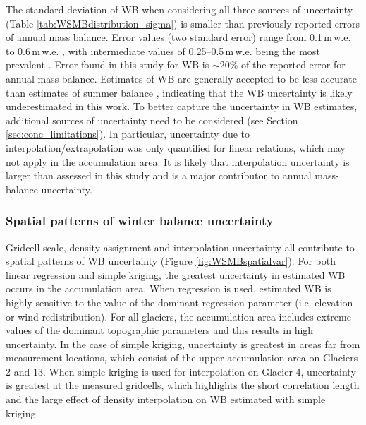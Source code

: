 \documentclass{sfuthesis}
\begin{document}
The standard deviation of WB when considering all three sources of uncertainty 
(Table \ref{tab:WSMBdistribution_sigma}) is smaller than previously reported errors of annual mass balance. Error values (two standard error) range from 0.1\,m\,w.e. \citep{Jansson1999} to 0.6\,m\,w.e. \citep{Funk1997}, with intermediate values of 0.25--0.5\,m\,w.e. being the most prevalent \citep[e.g.][]{Zemp2009,Wagnon2013}. Error found in this study for WB is $\sim$20\% of the reported error for annual mass balance. Estimates of WB are generally accepted to be less accurate than estimates of summer balance \citep[e.g.][]{Zemp2009,Reveillet2016}, indicating that the WB uncertainty is likely underestimated in this work. To better capture the uncertainty in WB estimates, additional sources of uncertainty need to be considered (see Section \ref{sec:conc_limitations}). In particular, uncertainty due to interpolation/extrapolation was only quantified for linear relations, which may not apply in the accumulation area. It is likely that interpolation uncertainty is larger than assessed in this study and is a major contributor to annual mass-balance uncertainty.


\subsubsection{Spatial patterns of winter balance uncertainty}

Gridcell-scale, density-assignment and interpolation uncertainty all contribute to spatial patterns of WB uncertainty (Figure \ref{fig:WSMBspatialvar}). For both linear regression and simple kriging, the greatest uncertainty in estimated WB occurs in the accumulation area. When regression is used, estimated WB is highly sensitive to the value of the dominant regression parameter (i.e. elevation or wind redistribution). For all glaciers, the accumulation area includes extreme values of the dominant topographic parameters and this results in high uncertainty. In the case of simple kriging, uncertainty is greatest in areas far from measurement locations, which consist of the upper accumulation area on Glaciers 2 and 13. When simple kriging is used for interpolation on Glacier 4, uncertainty is greatest at the measured gridcells, which highlights the short correlation length and the large effect of density interpolation on WB estimated with simple kriging.
\end{document}
